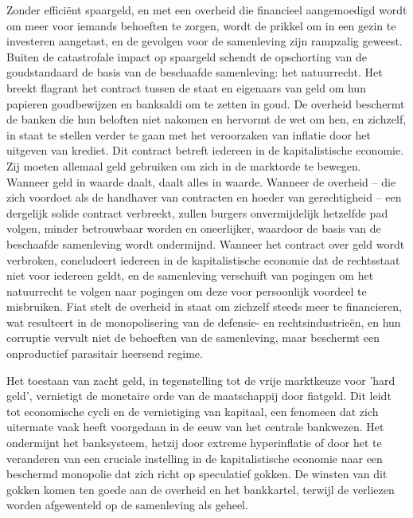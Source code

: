 Zonder efficiënt spaargeld, en met een overheid die financieel aangemoedigd wordt om meer voor iemands behoeften te zorgen, wordt de prikkel om in een gezin te investeren aangetast, en de gevolgen voor de samenleving zijn rampzalig geweest. Buiten de catastrofale impact op spaargeld schendt de opschorting van de goudstandaard de basis van de beschaafde samenleving: het natuurrecht. Het breekt flagrant het contract tussen de staat en eigenaars van geld om hun papieren goudbewijzen en banksaldi om te zetten in goud. De overheid beschermt de banken die hun beloften niet nakomen en hervormt de wet om hen, en zichzelf, in staat te stellen verder te gaan met het veroorzaken van inflatie door het uitgeven van krediet. Dit contract betreft iedereen in de kapitalistische economie. Zij moeten allemaal geld gebruiken om zich in de marktorde te bewegen. Wanneer geld in waarde daalt, daalt alles in waarde. Wanneer de overheid -- die zich voordoet als de handhaver van contracten en hoeder van gerechtigheid -- een dergelijk solide contract verbreekt, zullen burgers onvermijdelijk hetzelfde pad volgen, minder betrouwbaar worden en oneerlijker, waardoor de basis van de beschaafde samenleving wordt ondermijnd. Wanneer het contract over geld wordt verbroken, concludeert iedereen in de kapitalistische economie dat de rechtsstaat niet voor iedereen geldt, en de samenleving verschuift van pogingen om het natuurrecht te volgen naar pogingen om deze voor persoonlijk voordeel te misbruiken. Fiat stelt de overheid in staat om zichzelf steeds meer te financieren, wat resulteert in de monopolisering van de defensie- en rechtsindustrieën, en hun corruptie vervult niet de behoeften van de samenleving, maar beschermt een onproductief parasitair heersend regime.

Het toestaan van zacht geld, in tegenstelling tot de vrije marktkeuze voor 'hard geld', vernietigt de monetaire orde van de maatschappij door fiatgeld. Dit leidt tot economische cycli en de vernietiging van kapitaal, een fenomeen dat zich uitermate vaak heeft voorgedaan in de eeuw van het centrale bankwezen. Het ondermijnt het banksysteem, hetzij door extreme hyperinflatie of door het te veranderen van een cruciale instelling in de kapitalistische economie naar een beschermd monopolie dat zich richt op speculatief gokken. De winsten van dit gokken komen ten goede aan de overheid en het bankkartel, terwijl de verliezen worden afgewenteld op de samenleving als geheel.

